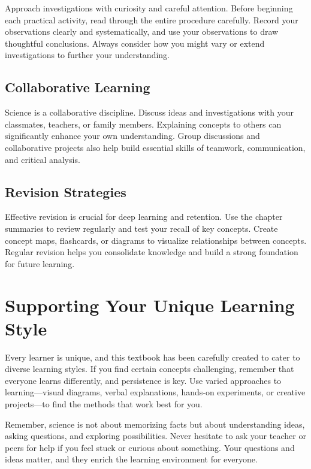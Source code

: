 Approach investigations with curiosity and careful attention. Before beginning each practical activity, read through the entire procedure carefully. Record your observations clearly and systematically, and use your observations to draw thoughtful conclusions. Always consider how you might vary or extend investigations to further your understanding.

\subsection{Collaborative Learning}

Science is a collaborative discipline. Discuss ideas and investigations with your classmates, teachers, or family members. Explaining concepts to others can significantly enhance your own understanding. Group discussions and collaborative projects also help build essential skills of teamwork, communication, and critical analysis.

\subsection{Revision Strategies}

Effective revision is crucial for deep learning and retention. Use the chapter summaries to review regularly and test your recall of key concepts. Create concept maps, flashcards, or diagrams to visualize relationships between concepts. Regular revision helps you consolidate knowledge and build a strong foundation for future learning.

\section{Supporting Your Unique Learning Style}

Every learner is unique, and this textbook has been carefully created to cater to diverse learning styles. If you find certain concepts challenging, remember that everyone learns differently, and persistence is key. Use varied approaches to learning—visual diagrams, verbal explanations, hands-on experiments, or creative projects—to find the methods that work best for you.

Remember, science is not about memorizing facts but about understanding ideas, asking questions, and exploring possibilities. Never hesitate to ask your teacher or peers for help if you feel stuck or curious about something. Your questions and ideas matter, and they enrich the learning environment for everyone.

